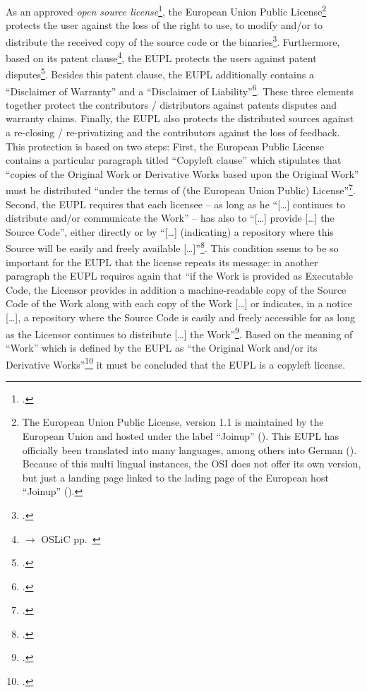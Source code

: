 As an approved \emph{open source license}\footcite[cf.][\nopage wp]{OSI2012b},
the European Union Public License\footnote{ The European Union Public License,
version 1.1 is maintained by the European Union and hosted under the label
\enquote{Joinup} (\cite[cf.][\nopage wp]{EuplLicense2007en}).
This EUPL has officially been translated into many languages, among others into
German (\cite[cf.][\nopage wp]{EuplLicense2007de}). Because of this multi
lingual instances, the OSI does not offer its own version, but just a landing
page linked to the lading page of the European host \enquote{Joinup}
(\cite[cf.][\nopage wp]{Eupl11OsiLicense2007a}).} protects the user against the
loss of the right to use, to modify and/or to distribute the received copy of
the source code or the binaries\footcite[cf.][\nopage wp.\
§2]{EuplLicense2007de}. Furthermore, based on its patent
clause\footnote{$\rightarrow$ OSLiC pp.\ \pageref{subsec:EupLPatentClause}}, the
EUPL protects the users against patent disputes\footcite[cf.][\nopage wp.\ §2,
at its tail]{EuplLicense2007en}. Besides this patent clause, the EUPL
additionally contains a \enquote{Disclaimer of Warranty} and a
\enquote{Disclaimer of Liability}\footcite[cf.][\nopage wp.\ §7 \&
§8]{EuplLicense2007en}. These three elements together protect the contributors /
distributors against patents disputes and warranty claims. Finally, the EUPL
also protects the distributed sources against a re-closing / re-privatizing
and the contributors against the loss of feedback. This protection is based on
two steps: First, the European Public License contains a particular paragraph
titled \enquote{Copyleft clause} which stipulates that \enquote{copies of the
Original Work or Derivative Works based upon the Original Work} must be
distributed \enquote{under the terms of (the European Union Public)
License}\footcite[cf.][\nopage wp.\ §5]{EuplLicense2007en}. Second, the EUPL
requires that each licensee -- as long as he \enquote{[\ldots] continues to
distribute and/or communicate the Work} -- has also to \enquote{[\ldots] provide
[\ldots] the Source Code}, either directly or by \enquote{[\ldots] (indicating)
a repository where this Source will be easily and freely available
[\ldots]}\footcite[cf.][\nopage wp.\ §5]{EuplLicense2007en}. This condition
ssems to be so important for the EUPL that the license repeats its message: in
another paragraph the EUPL requires again that \enquote{if the Work is provided
as Executable Code, the Licensor provides in addition a machine-readable copy of
the Source Code of the Work along with each copy of the Work [\ldots] or
indicates, in a notice [\ldots], a repository where the Source Code is easily
and freely accessible for as long as the Licensor continues to distribute
[\ldots] the Work}\footcite[cf.][\nopage wp.\ §3]{EuplLicense2007en}. Based on
the meaning of \enquote{Work} which is defined by the EUPL as \enquote{the
Original Work and/or its Derivative Works}\footcite[cf.][\nopage wp.\
§1]{EuplLicense2007en} it must be concluded that the EUPL is a copyleft license.

